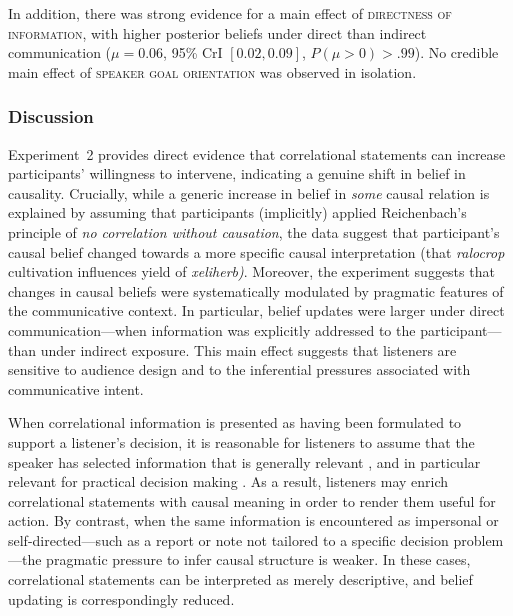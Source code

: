 \documentclass[10pt,letterpaper]{article}
\begin{document}
In addition, there was strong evidence for a main effect of \textsc{directness of information}, with higher posterior beliefs under direct than indirect communication ($\mu = 0.06$, 95\% CrI $[0.02, 0.09]$, $P(\mu > 0) > .99$). No credible main effect of \textsc{speaker goal orientation} was observed in isolation.

\subsubsection{Discussion}

Experiment~2 provides direct evidence that correlational statements can increase participants’ willingness to intervene, indicating a genuine shift in belief in causality. Crucially, while a generic increase in belief in \textit{some} causal relation is explained by assuming that participants (implicitly) applied Reichenbach's principle of \textit{no correlation without causation}, the data suggest that participant's causal belief changed towards a more specific causal interpretation (that \textit{ralocrop} cultivation influences yield of \textit{xeliherb)}.
Moreover, the experiment suggests that changes in causal beliefs were systematically modulated by pragmatic features of the communicative context. 
In particular, belief updates were larger under direct communication—when information was explicitly addressed to the participant—than under indirect exposure. This main effect suggests that listeners are sensitive to audience design and to the inferential pressures associated with communicative intent.

When correlational information is presented as having been formulated to support a listener’s decision, it is reasonable for listeners to assume that the speaker has selected information that is generally relevant \citep{SperberWilson1995}, and in particular relevant for practical decision making \citep{BenzvanRooijOptimalAssertions2007}. 
As a result, listeners may enrich correlational statements with causal meaning in order to render them useful for action. By contrast, when the same information is encountered as impersonal or self-directed—such as a report or note not tailored to a specific decision problem—the pragmatic pressure to infer causal structure is weaker. In these cases, correlational statements can be interpreted as merely descriptive, and belief updating is correspondingly reduced.
\end{document}
